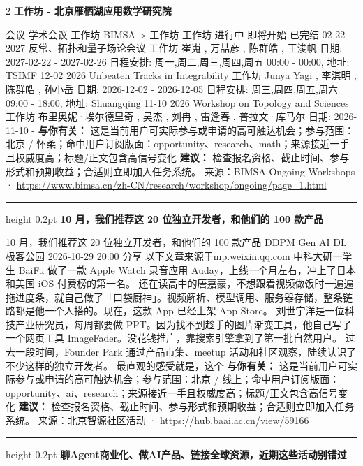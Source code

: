 \documentclass[10.5pt]{ctexart}
\begin{document}
\begin{multicols}{2}
{\large\bfseries 工作坊 - 北京雁栖湖应用数学研究院}\par
会议 学术会议 工作坊 BIMSA > 工作坊 工作坊 进行中 即将开始 已完结 02-22 2027 反常、拓扑和量子场论会议 工作坊 崔嵬 , 万喆彦 , 陈群皓 , 王浚帆 日期: 2027-02-22 - 2027-02-26 日程安排: 周一,周二,周三,周四,周五 00:00 - 00:00, 地址: TSIMF 12-02 2026 Unbeaten Tracks in Integrability 工作坊 Junya Yagi , 李淇明 , 陈群皓 , 孙小岳 日期: 2026-12-02 - 2026-12-05 日程安排: 周三,周四,周五,周六 09:00 - 18:00, 地址: Shuangqing 11-10 2026 Workshop on Topology and Sciences 工作坊 布里奥妮·埃尔德里奇 , 吴杰 , 刘冉 , 雷逢春 , 普拉文·库马尔 日期: 2026-11-10 - 
\textbf{与你有关：} 这是当前用户可实际参与或申请的高可触达机会；参与范围：北京 / 怀柔；命中用户订阅版面：opportunity、research、math；来源接近一手且权威度高；标题/正文包含高信号变化
\textbf{建议：} 检查报名资格、截止时间、参与形式和预期收益；合适则立即加入任务系统。
{\footnotesize\color{ormuted} 来源：BIMSA Ongoing Workshops · \url{https://www.bimsa.cn/zh-CN/research/workshop/ongoing/page_1.html}}
\vspace{2mm}
\hrule height 0.2pt
\vspace{2mm}
{\large\bfseries 10 月，我们推荐这 20 位独立开发者，和他们的 100 款产品}\par
10 月，我们推荐这 20 位独立开发者，和他们的 100 款产品 DDPM Gen AI DL 极客公园 2026-10-29 20:00 分享 以下文章来源于mp.weixin.qq.com 中科大研一学生 BaiFu 做了一款 Apple Watch 录音应用 Auday，上线一个月左右，冲上了日本和美国 iOS 付费榜的第一名。 还在读高中的唐嘉豪，不想跟着视频做饭时一遍遍拖进度条，就自己做了「口袋厨神」。视频解析、模型调用、服务器存储，整条链路都是他一个人搭的。现在，这款 App 已经上架 App Store。 刘世宇洋是一位科技产业研究员，每周都要做 PPT。因为找不到趁手的图片渐变工具，他自己写了一个网页工具 ImageFader。没花钱推广，靠搜索引擎拿到了第一批自然用户。 过去一段时间，Founder Park 通过产品市集、meetup 活动和社区观察，陆续认识了不少这样的独立开发者。 最直观的感受就是，这个
\textbf{与你有关：} 这是当前用户可实际参与或申请的高可触达机会；参与范围：北京 / 线上；命中用户订阅版面：opportunity、ai、research；来源接近一手且权威度高；标题/正文包含高信号变化
\textbf{建议：} 检查报名资格、截止时间、参与形式和预期收益；合适则立即加入任务系统。
{\footnotesize\color{ormuted} 来源：北京智源社区活动 · \url{https://hub.baai.ac.cn/view/59166}}
\vspace{2mm}
\hrule height 0.2pt
\vspace{2mm}
{\large\bfseries 聊Agent商业化、做AI产品、链接全球资源，近期这些活动别错过}\par

\end{multicols}
\end{document}
